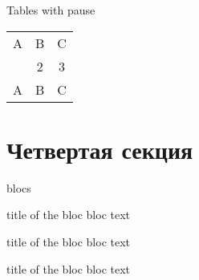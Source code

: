 \documentclass{beamer}
\begin{document}
\begin{frame}{Tables with pause}
\begin{tabular}{c c c}
A & B & C \\ 
\pause 
1 & 2 & 3 \\  
\pause 
A & B & C \\ 
\end{tabular}
\end{frame}


\section{Четвертая секция}
\begin{frame}{blocs}

\begin{block}{title of the bloc}
bloc text
\end{block}

\begin{exampleblock}{title of the bloc}
bloc text
\end{exampleblock}


\begin{alertblock}{title of the bloc}
bloc text
\end{alertblock}
\end{frame}
\end{document}
